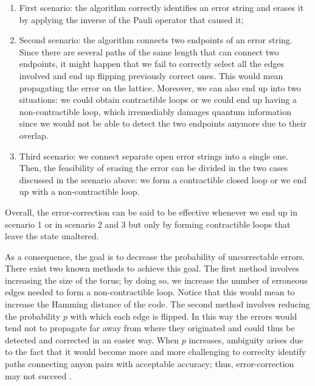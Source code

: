 \documentclass{Configuration_Files/PoliMi3i_thesis}
\begin{document}
\begin{enumerate}
	\item First scenario: the algorithm correctly identifies an error string and erases it by applying the inverse of the Pauli operator that caused it;
	
	\item Second scenario: the algorithm connects two endpoints of an error string. Since there are several paths of the same length that can connect two endpoints, it might happen that we fail to correctly select all the edges involved and end up flipping previously correct ones. This would mean propagating the error on the lattice. \newline 
	Moreover, we can also end up into two situations: we could obtain contractible loops or we could end up having a non-contractible loop, which irremediably damages quantum information since we would not be able to detect the two endpoints anymore due to their overlap.
	
	\item Third scenario: we connect separate open error strings into a single one. Then, the feasibility of erasing the error can be divided in the two cases discussed in the scenario above: we form a contractible closed loop or we end up with a non-contractible loop. 
	
\end{enumerate}


Overall, the error-correction can be said to be effective whenever we end up in scenario 1 or in scenario 2 and 3 but only by forming contractible loops that leave the state unaltered. \newline

As a consequence, the goal is to decrease the probability of uncorrectable errors. There exist two known methods to achieve this goal. The first method involves increasing the size of the torus; by doing so, we increase the number of erroneous edges needed to form a non-contractible loop. Notice that this would mean to increase the Hamming distance of the code.\newline 
The second method involves reducing the probability $p$ with which each edge is flipped. In this way the errors would tend not to propagate far away from where they originated and could thus be detected and corrected in an easier way. When $p$ increases, ambiguity arises due to the fact that it would become more and more challenging to correclty identify paths connecting anyon pairs with acceptable accuracy; thus, error-correction may not succeed \cite{Zbi19}. \newline
\newline
\end{document}
